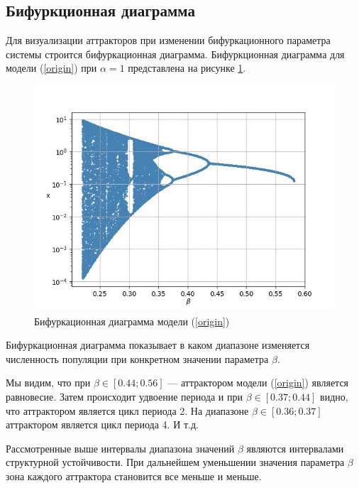 \subsection{Бифуркционная диаграмма}    

    Для визуализации аттракторов при изменении бифуркационного параметра системы строится бифуркационная диаграмма. Бифуркционная диаграмма для модели (\ref{origin}) при \(\alpha = 1\) представлена на рисунке \ref{bifurcation}.

    \begin{figure}
        \centering
        \includegraphics[width=\textwidth]{deterministic/images/bifurcation.jpg}

        \captionsetup{justification=centering}
        \caption{Бифуркационная диаграмма модели (\ref{origin})}
        \label{bifurcation}
    \end{figure}

    Бифуркационная диаграмма показывает в каком диапазоне изменяется численность популяции при конкретном значении параметра \(\beta\).

    Мы видим, что при \(\beta \in [0.44; 0.56]\) --- аттрактором модели (\ref{origin}) является равновесие. Затем происходит удвоение периода и при \(\beta \in [0.37; 0.44]\) видно, что аттрактором является цикл периода 2. На диапазоне \(\beta \in [0.36; 0.37]\) аттрактором является цикл периода 4. И т.д.
        
    Рассмотренные выше интервалы диапазона значений \(\beta\) являются интервалами структурной устойчивости. При дальнейшем уменьшении значения параметра \(\beta\) зона каждого аттрактора становится все меньше и меньше. 
        
